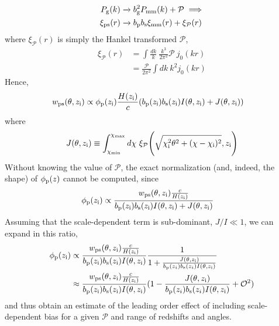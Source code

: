 \documentclass[a4paper,usenatbib]{mnras}
\begin{document}
\begin{align}
    P_{\rm g}(k) &\xrightarrow{} b_{\rm g}^2P_{\rm mm}(k) + \mathcal{P} \implies \\
    \xi_{\rm ps}(r) &\xrightarrow{} b_{\rm p}b_{\rm s}\xi_{\rm mm}(r) + \xi_{\mathcal{P}}(r)
\end{align}
where $\xi_{\mathcal{P}}(r)$ is simply the Hankel transformed $\mathcal{P}$,
\begin{align}
    \xi_{\mathcal{P}}(r) &= \int \frac{dk}{k} \ \frac{k^3}{2\pi^2} \mathcal{P} \ j_0(kr) \\
     &= \frac{\mathcal{P}}{2\pi^2}\int dk \ k^2 j_0(kr)
\end{align}
Hence, 
\begin{align}
    w_{\rm ps}(\theta, z_{\rm i}) &\propto \phi_{\rm p}(z_{\rm i})\frac{H(z_{\rm i})}{c}(b_{\rm p}(z_{\rm i})b_{\rm s}(z_{\rm i}){I}(\theta, z_{\rm i}) + J(\theta, z_{\rm i}))
\end{align}
where 
\begin{align}
    J(\theta, z_{\rm i}) \equiv \int_{\chi_{\rm min}}^{\chi_{\rm max}}d\chi \ \xi_{\mathcal{P}}{\Bigg (}\sqrt{\chi_{\rm i}^2\theta^2 + (\chi-\chi_{\rm i})^2},z_{\rm i}{\Bigg )}
\end{align}
Without knowing the value of $\mathcal{P}$, the exact normalization (and, indeed, the shape) of $\phi_{\rm p}(z)$ cannot be computed, since
\begin{align}
    \phi_{\rm p}(z_{\rm i}) &\propto \frac{{w}_{\rm ps}(\theta, z_{\rm i})\frac{c}{H(z_{\rm i})}}{b_{\rm p}(z_{\rm i})b_{\rm s}(z_{\rm i}){I}(\theta, z_{\rm i}) + {J}(\theta, z_{\rm i})}
\end{align}
Assuming that the scale-dependent term is sub-dominant, $J/I \ll 1$, we can expand in this ratio,
\begin{align}
    \phi_{\rm p}(z_{\rm i}) &\propto \frac{{w}_{\rm ps}(\theta, z_{\rm i})\frac{c}{H(z_{\rm i})}}{b_{\rm p}(z_{\rm i})b_{\rm s}(z_{\rm i}){I}(\theta, z_{\rm i})}\frac{1}{1 + \frac{J(\theta, z_{\rm i})}{b_{\rm p}(z_i)b_{\rm s}(z_i)I(\theta, z_{\rm i})}} \\
    &\approx \frac{{w}_{\rm ps}(\theta, z_{\rm i})\frac{c}{H(z_{\rm i})}}{b_{\rm p}(z_{\rm i})b_{\rm s}(z_{\rm i}){I}(\theta, z_{\rm i})}(1 - \frac{J(\theta, z_{\rm i})}{b_{\rm p}(z_i)b_{\rm s}(z_i)I(\theta, z_{\rm i})} + \mathcal{O}^2) \nonumber
\end{align}
and thus obtain an estimate of the leading order effect of including scale-dependent bias for a given $\mathcal{P}$ and range of redshifts and angles.



\bsp	%
\label{lastpage}
\end{document}

